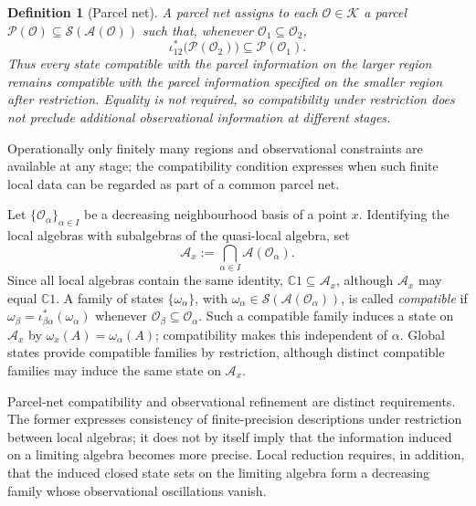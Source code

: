 \documentclass[11pt]{article}
\newtheorem{definition}[theorem]{Definition}
\newcommand{\A}{\mathcal{A}}
\begin{document}
\begin{definition}[Parcel net]
\label{def:parcelnet}
A \emph{parcel net} assigns to each $\mathcal O\in\mathcal K$ a parcel
$\mathcal P(\mathcal O)\subseteq\mathcal S(\A(\mathcal O))$ such that,
whenever $\mathcal O_1\subseteq\mathcal O_2$,
\[
\iota_{12}^*\bigl(\mathcal P(\mathcal O_2)\bigr)
\subseteq
\mathcal P(\mathcal O_1).
\]
Thus every state compatible with the parcel information on the larger
region remains compatible with the parcel information specified on the
smaller region after restriction. Equality is not required, so
compatibility under restriction does not preclude additional
observational information at different stages.
\end{definition}

Operationally only finitely many regions and observational constraints are
available at any stage; the compatibility condition expresses when such
finite local data can be regarded as part of a common parcel net.

Let $\{\mathcal O_\alpha\}_{\alpha\in I}$ be a decreasing neighbourhood
basis of a point $x$. Identifying the local algebras with subalgebras of
the quasi-local algebra, set
\[
\A_x:=\bigcap_{\alpha\in I}\A(\mathcal O_\alpha).
\]
Since all local algebras contain the same identity,
$\mathbb C1\subseteq\A_x$, although $\A_x$ may equal $\mathbb C1$.
A family of states $\{\omega_\alpha\}$, with
$\omega_\alpha\in\mathcal S(\A(\mathcal O_\alpha))$, is called
\emph{compatible} if
$\omega_\beta=\iota_{\beta\alpha}^*(\omega_\alpha)$ whenever
$\mathcal O_\beta\subseteq\mathcal O_\alpha$. Such a compatible family
induces a state on $\A_x$ by $\omega_x(A)=\omega_\alpha(A)$;
compatibility makes this independent of $\alpha$. Global states provide
compatible families by restriction, although distinct compatible families
may induce the same state on $\A_x$.

Parcel-net compatibility and observational refinement are distinct
requirements. The former expresses consistency of finite-precision
descriptions under restriction between local algebras; it does not by
itself imply that the information induced on a limiting algebra becomes
more precise. Local reduction requires, in addition, that the induced
closed state sets on the limiting algebra form a decreasing family whose
observational oscillations vanish.
\end{document}
